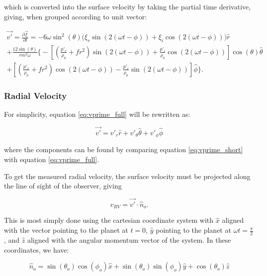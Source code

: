 \documentclass[11pt]{amsart}
\begin{document}
which is converted into the surface velocity by taking the partial time derivative, giving, when grouped according to unit vector:

\begin{multline} \label{eq:vprime_full}
\vec{v'} = \frac{\partial \vec{\xi}}{\partial t} =    - 6 \omega \sin^{2}(\theta) \Big(  \xi_{r} \sin \left( 2 ( \omega t - \phi) \right)  + \xi_{i} \cos \left( 2 ( \omega t - \phi) \right) \Big) \hat{r} \\
+ \frac{12 \sin(\theta)}{r m^{2} \omega}  \Bigg\{  - \left[ \left(   \frac{p'_{r}}{\rho_{0}}  +  f r^{2} \right) \sin(2( \omega t - \phi ))  + \frac{p'_{i}}{\rho_{0}} \cos (2( \omega t - \phi )) \right]  \cos(\theta) \hat{\theta}  \\
+  \left[ \left(   \frac{p'_{r}}{\rho_{0}}  +  f r^{2} \right) \cos (2( \omega t - \phi )) - \frac{p'_{i}}{\rho_{0}} \sin(2( \omega t - \phi )) \right] \hat{\phi}    \Bigg\}.
\end{multline}


\subsubsection{Radial Velocity} \label{RV:Implementation:RV}

For simplicity, equation \ref{eq:vprime_full} will be rewritten as:

\begin{equation} \label{eq:vprime_short}
\vec{v'} = v'_{r} \hat{r} + v'_{\theta} \hat{\theta} + v'_{\phi} \hat{\phi}
\end{equation}

where the components can be found by comparing equation \ref{eq:vprime_short} with equation \ref{eq:vprime_full}.

To get the measured radial velocity, the surface velocity must be projected along the line of sight of the observer, giving

\begin{equation}
v_{RV} = \vec{v'} \cdot \hat{n}_{o}.
\end{equation}

This is most simply done using the cartesian coordinate system with $\hat{x}$ aligned with the vector pointing to the planet at $t = 0$, $\hat{y}$ pointing to the planet at $\omega t = \frac{\pi}{2}$, and $\hat{z}$ aligned with the angular momentum vector of the system.  In these coordinates, we have:

\begin{equation}
\hat{n}_{o} = \sin(\theta_{o}) \cos(\phi_{o}) \hat{x} + \sin(\theta_{o}) \sin(\phi_{o}) \hat{y} + \cos(\theta_{o}) \hat{z}
\end{equation}
\end{document}
